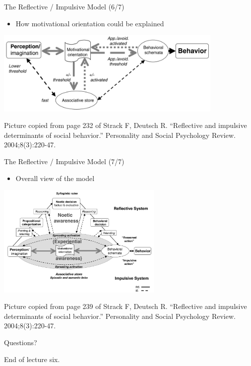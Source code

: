 \documentclass{beamer}
\begin{document}
\begin{frame}
{\centerline{The Reflective / Impulsive Model (6/7)}}
\begin{itemize}
    \item How motivational orientation could be explained
\end{itemize} 

\begin{center}

 \includegraphics[width=11cm]{P2023.AIBCCSS.KnowledgeAcquisitionRetentionUse/RI.MotivationalOrientation.jpg}
 
 \end{center}

\begin{center}
    \tiny{Picture copied from page 232 of Strack F, Deutsch R. ``Reflective and impulsive determinants of social behavior.'' Personality and Social Psychology Review. 2004;8(3):220-47.}
    \end{center}

\end{frame}


\begin{frame}
{\centerline{The Reflective / Impulsive Model (7/7)}}
\begin{itemize}
    \item Overall view of the model
\end{itemize} 

\begin{center}

 \includegraphics[width=8cm]{P2023.AIBCCSS.KnowledgeAcquisitionRetentionUse/RI.ComprehensiveView.jpg}
 
 \end{center}

\begin{center}
    \tiny{Picture copied from page 239 of Strack F, Deutsch R. ``Reflective and impulsive determinants of social behavior.'' Personality and Social Psychology Review. 2004;8(3):220-47.}
    \end{center}

\end{frame}

\begin{frame}
{\centerline{Questions?}}
\vspace{1cm}
\begin{center}
    \LARGE{End of lecture six.}
\end{center}

\end{frame}
\end{document}

